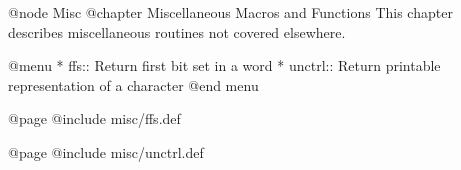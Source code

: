 @node Misc
@chapter Miscellaneous Macros and Functions
This chapter describes miscellaneous routines not covered elsewhere.

@menu 
* ffs::      Return first bit set in a word
* unctrl::   Return printable representation of a character
@end menu

@page
@include misc/ffs.def

@page
@include misc/unctrl.def
